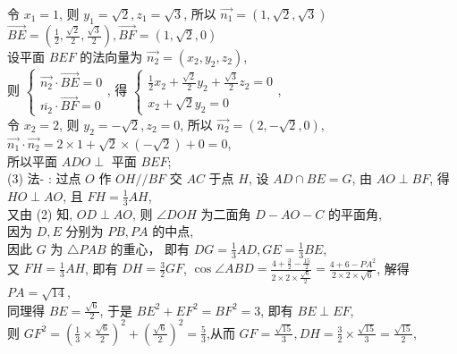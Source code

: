 \documentclass[a4paper,11pt,UTF8]{article}
\begin{document}
令 $x_1=1$, 则 $y_1=\sqrt{2}, z_1=\sqrt{3}$, 所以 $\overrightarrow{n_1}=(1, \sqrt{2}, \sqrt{3})$\\
$\displaystyle
\overrightarrow{B E}=\left(\frac{1}{2}, \frac{\sqrt{2}}{2}, \frac{\sqrt{3}}{2}\right), \overrightarrow{B F}=(1, \sqrt{2}, 0)
$\\
设平面 $B E F$ 的法向量为 $\overrightarrow{n_2}=\left(x_2, y_2, z_2\right)$,\\
则 $\displaystyle\left\{\begin{array}{l}\displaystyle\overrightarrow{n_2} \cdot \overrightarrow{B E}=0 \\ \displaystyle\overline{n_2} \cdot \overrightarrow{B F}=0\end{array}\right.$, 得 $\displaystyle\left\{\begin{array}{l}\displaystyle\frac{1}{2} x_2+\frac{\sqrt{2}}{2} y_2+\frac{\sqrt{3}}{2} z_2=0 \\\displaystyle x_2+\sqrt{2} y_2=0\end{array}\right.$,\\
令 $x_2=2$, 则 $y_2=-\sqrt{2}, z_2=0$, 所以 $\overrightarrow{n_2}=(2,-\sqrt{2}, 0)$,\\ $\overrightarrow{n_1} \cdot \overrightarrow{n_2}=2 \times 1+\sqrt{2} \times(-\sqrt{2})+0=0$,\\
所以平面 $A D O \perp$ 平面 $B E F$;\\
(3) 法- : 过点 $O$ 作 $O H / / B F$ 交 $A C$ 于点 $H$, 设 $A D \cap B E=G$, 由 $A O \perp B F$, 得 $H O \perp A O$, 且 $F H=\frac{1}{3} A H$,\\
又由 (2) 知, $O D \perp A O$, 则 $\angle D O H$ 为二面角 $D-A O-C$ 的平面角,\\
因为 $D, E$ 分别为 $P B, P A$ 的中点, \\
因此 $G$ 为 $\triangle P A B$ 的重心， 即有 $\displaystyle D G=\frac{1}{3} A D, G E=\frac{1}{3} B E$, \\
又 $F H=\frac{1}{3} A H$, 即有 $\displaystyle D H=\frac{3}{2} G F$, $\displaystyle\cos \angle A B D=\frac{4+\frac{3}{2}-\frac{15}{2}}{2 \times 2 \times \frac{\sqrt{6}}{2}}=\frac{4+6-P A^2}{2 \times 2 \times \sqrt{6}}$, 解得 $P A=\sqrt{14}$, \\
同理得 $B E=\frac{\sqrt{6}}{2}$, 于是 $B E^2+E F^2=B F^2=3$, 即有 $B E \perp E F$,\\
则 $\displaystyle G F^2=\left(\frac{1}{3} \times \frac{\sqrt{6}}{2}\right)^2+\left(\frac{\sqrt{6}}{2}\right)^2=\frac{5}{3}$,从而 $\displaystyle G F=\frac{\sqrt{15}}{3}, D H=\frac{3}{2} \times \frac{\sqrt{15}}{3}=\frac{\sqrt{15}}{2}$, \\
\end{document}
